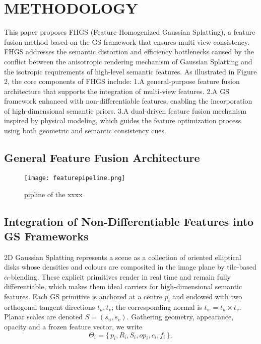 \documentclass[numbers]{article}
\begin{document}
\section{METHODOLOGY}
This paper proposes FHGS (Feature-Homogenized Gaussian Splatting), a feature fusion method based on the GS framework that ensures multi-view consistency. FHGS addresses the semantic distortion and efficiency bottlenecks caused by the conflict between the anisotropic rendering mechanism of Gaussian Splatting and the isotropic requirements of high-level semantic features. As illustrated in Figure 2, the core components of FHGS include:
1.A general-purpose feature fusion architecture that supports the integration of multi-view features.
2.A GS framework enhanced with non-differentiable features, enabling the incorporation of high-dimensional semantic priors.
3.A dual-driven feature fusion mechanism inspired by physical modeling, which guides the feature optimization process using both geometric and semantic consistency cues.
\subsection{General Feature Fusion Architecture}
\begin{figure}[htbp]
  \centering
  \texttt{[image: featurepipeline.png]} %
  \caption{pipline of the xxxx}
  \label{fig:pipeline} %
\end{figure}

\subsection{Integration of Non-Differentiable Features into GS Frameworks}
2D Gaussian Splatting represents a scene as a collection of oriented elliptical disks whose densities and colours are composited in the image plane by tile-based $\alpha$-blending. These explicit primitives render in real time and remain fully differentiable, which makes them ideal carriers for high-dimensional semantic features. Each GS primitive is anchored at a centre \(p_i\) and endowed with two orthogonal tangent directions \(t_u,t_v\); the corresponding normal is \(t_w=t_u\times t_v\).  
Planar scales are denoted \(S=(s_u,s_v)\).  
Gathering geometry, appearance, opacity and a frozen feature vector, we write 
\begin{equation}
    \Theta_i=\{\,p_i,R_i,S_i,op_i,c_i,f_i\,\},
\end{equation}
\end{document}
